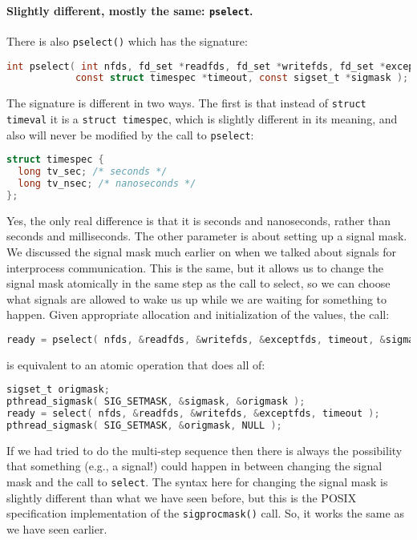 \paragraph{Slightly different, mostly the same: \texttt{pselect}.}
There is also \texttt{pselect()} which has the signature:
\begin{lstlisting}[language=C]
int pselect( int nfds, fd_set *readfds, fd_set *writefds, fd_set *exceptfds, 
            const struct timespec *timeout, const sigset_t *sigmask );
\end{lstlisting}

The signature is different in two ways. The first is that instead of \texttt{struct timeval} it is a \texttt{struct timespec}, which is slightly different in its meaning, and also will never be modified by the call to \texttt{pselect}:

\begin{lstlisting}[language=C]
struct timespec {
  long tv_sec; /* seconds */
  long tv_nsec; /* nanoseconds */
};
\end{lstlisting}

Yes, the only real difference is that it is seconds and nanoseconds, rather than seconds and milliseconds. The other parameter is about setting up a signal mask. We discussed the signal mask much earlier on when we talked about signals for interprocess communication. This is the same, but it allows us to change the signal mask atomically in the same step as the call to select, so we can choose what signals are allowed to wake us up while we are waiting for something to happen. Given appropriate allocation and initialization of the values, the call:


\begin{lstlisting}[language=C]
ready = pselect( nfds, &readfds, &writefds, &exceptfds, timeout, &sigmask );
\end{lstlisting}

is equivalent to an atomic operation that does all of:

\begin{lstlisting}[language=C]
sigset_t origmask;
pthread_sigmask( SIG_SETMASK, &sigmask, &origmask );
ready = select( nfds, &readfds, &writefds, &exceptfds, timeout );
pthread_sigmask( SIG_SETMASK, &origmask, NULL );
\end{lstlisting}

If we had tried to do the multi-step sequence then there is always the possibility that something (e.g., a signal!) could happen in between changing the signal mask and the call to \texttt{select}. The syntax here for changing the signal mask is slightly different than what we have seen before, but this is the POSIX specification implementation of the \texttt{sigprocmask()} call. So, it works the same as we have seen earlier.

